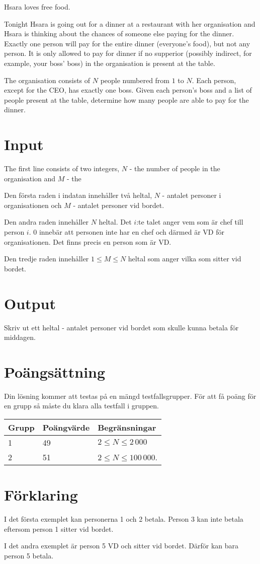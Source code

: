 
Hsara loves free food.

Tonight Hsara is going out for a dinner at a restaurant with her organisation and Hsara is thinking about the chances of someone else paying for the dinner. Exactly one person will pay for the entire dinner (everyone's food), but not any person. It is only allowed to pay for dinner if no supperior (possibly indirect, for example, your boss' boss) in the organisation is present at the table.

The organisation consists of $N$ people numbered from $1$ to $N$. Each person, except for the CEO, has exactly one boss. Given each person's boss and a list of people present at the table, determine how many people are able to pay for the dinner.

\section*{Input}

The first line consists of two integers, $N$ - the number of people in the organisation and $M$ - the 

Den första raden i indatan innehåller två heltal, $N$ - antalet personer i organisationen och $M$ - antalet personer vid bordet.

Den andra raden innehåller $N$ heltal. Det $i$:te talet anger vem som är chef till person $i$. 0 innebär att personen inte har en chef och därmed är VD för organisationen. Det finns precis en person som är VD.

Den tredje raden innehåller $1 \le M \le N$ heltal som anger vilka som sitter vid bordet.

\section*{Output}
Skriv ut ett heltal - antalet personer vid bordet som skulle kunna betala för middagen.

\section*{Poängsättning}
Din lösning kommer att testas på en mängd testfallsgrupper. För att få poäng för en grupp så måste du klara alla testfall i gruppen.

\begin{tabular}{| l | l | l |}
	\hline
	Grupp & Poängvärde & Begränsningar\\ \hline
  1     & 49         & $2 \le N \le 2\,000$ \\ \hline
  2     & 51         & $2 \le N \le 100\,000$. \\ \hline
\end{tabular}

\section*{Förklaring}
I det första exemplet kan personerna 1 och 2 betala. Person 3 kan inte betala eftersom person 1 sitter vid bordet.

I det andra exemplet är person 5 VD och sitter vid bordet. Därför kan bara person 5 betala.
